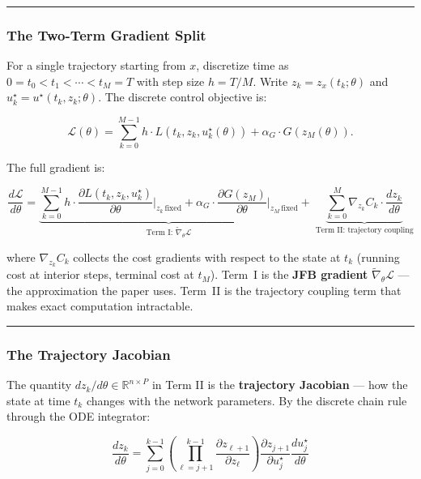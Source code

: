 \documentclass{article}
\begin{document}
\medskip\hrule\medskip

\subsubsection{The Two-Term Gradient Split}
\label{sec:full-gradient}

For a single trajectory starting from $x$, discretize time as $0 = t_0 <
t_1 < \cdots < t_M = T$ with step size $h = T/M$. Write
$z_k = z_x(t_k;\theta)$ and $u_k^\star = u^\star(t_k, z_k;\theta)$. The
discrete control objective is:

\begin{equation}
    \mathcal{L}(\theta)
    = \sum_{k=0}^{M-1} h \cdot L(t_k, z_k, u^\star_k(\theta))
    + \alpha_G \cdot G(z_M(\theta)).
    \label{eq:discrete_loss}
\end{equation}

The full gradient is:

\begin{equation}
    \frac{d\mathcal{L}}{d\theta}
    = \underbrace{
    \sum_{k=0}^{M-1} h \cdot
    \frac{\partial L(t_k, z_k, u^\star_k)}{\partial\theta}
    \bigg|_{z_k\,\text{fixed}}
    + \alpha_G \cdot \frac{\partial G(z_M)}{\partial\theta}
    \bigg|_{z_M\,\text{fixed}}
    }_{\text{Term I: } \widetilde{\nabla}_\theta\mathcal{L}}
    +\; \underbrace{
    \sum_{k=0}^{M} \nabla_{z_k} C_k \cdot
    \frac{dz_k}{d\theta}}_{\text{Term II: trajectory coupling}}
    \label{eq:full_gradient}
\end{equation}

where $\nabla_{z_k} C_k$ collects the cost gradients with respect to the
state at $t_k$ (running cost at interior steps, terminal cost at $t_M$).
Term~I is the \textbf{JFB gradient}
$\widetilde{\nabla}_\theta\mathcal{L}$ --- the approximation the paper uses.
Term~II is the trajectory coupling term that makes exact computation
intractable.

\medskip\hrule\medskip

\subsubsection{The Trajectory Jacobian}

The quantity $dz_k/d\theta \in \mathbb{R}^{n \times P}$ in Term II is the
\textbf{trajectory Jacobian} --- how the state at time $t_k$ changes with the
network parameters. By the discrete chain rule through the ODE integrator:

\begin{equation}
    \frac{dz_k}{d\theta}
    = \sum_{j=0}^{k-1}
    \left(\prod_{\ell=j+1}^{k-1} \frac{\partial z_{\ell+1}}{\partial z_\ell}
    \right)
    \frac{\partial z_{j+1}}{\partial u_j^\star}
    \frac{du_j^\star}{d\theta}
    \label{eq:traj_jacobian}
\end{equation}
\end{document}
